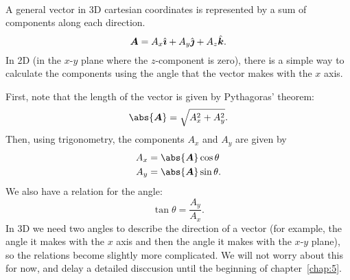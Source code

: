 \documentclass[../classical_mechanics.tex]{subfiles}
\begin{document}
        \paragraph{}
        A general vector in 3D cartesian coordinates is represented by a sum of components along each direction.
        \begin{equation}
            \boldsymbol{A}=A_x\hat{\boldsymbol{\imath}}+A_y\hat{\boldsymbol{\jmath}}+A_z\hat{\boldsymbol{k}}.
        \end{equation}
        In 2D (in the $x$-$y$ plane where the $z$-component is zero), there is a simple way to calculate the components using the angle that the vector makes with the $x$ axis.
        \begin{figure}[H]
            \centering
        \end{figure}
        First, note that the length of the vector is given by Pythagoras' theorem:
        \begin{equation}\label{eq:2d-polar-length}
            \abs{\vec{A}}=\sqrt{A_x^2+A_y^2}.
        \end{equation}
        Then, using trigonometry, the components $A_x$ and $A_y$ are given by
        \begin{align}
            A_x&=\abs{\vec{A}}\cos\theta\label{eq:2d-polar-x-component}\\
            A_y&=\abs{\vec{A}}\sin\theta\label{eq:2d-polar-y-component}.
        \end{align}
        We also have a relation for the angle:
        \begin{equation}
            \tan\theta=\frac{A_y}{A_x}\label{eq:2d-polar-theta}.
        \end{equation}
        In 3D we need two angles to describe the direction of a vector (for example, the angle it makes with the $x$ axis and then the angle it makes with the $x$-$y$ plane), so the relations become slightly more complicated.
        We will not worry about this for now, and delay a detailed disccusion until the beginning of chapter~\ref{chap:5}.
\end{document}
